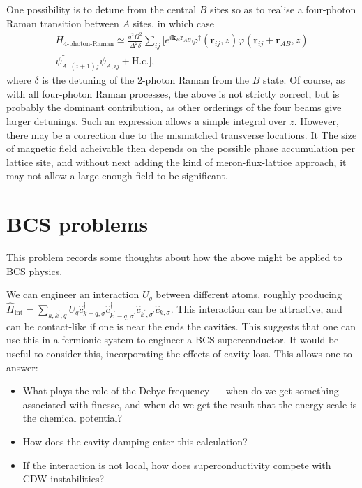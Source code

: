 \documentclass[twocolumn]{revtex4-1}
\renewcommand{\vec}[1]{\mathbf{#1}}
\begin{document}
One possibility is to detune from the central $B$ sites so as to
realise a four-photon Raman transition between $A$ sites, in which
case
\begin{multline}
  \label{eq:22}
  H_{\text{4-photon-Raman}} \simeq
  \frac{g^2\Omega^2}{\Delta^2 \delta}
  \sum_{ij} \Biggl[
    e^{i\vec{k}_R \vec{r}_{AB}} 
    \varphi^\dagger(\vec{r}_{ij},z) 
    \varphi^{}(\vec{r}_{ij}+\vec{r}_{AB},z) 
    \\\psi^\dagger_{A,(i+1)j} \psi^{}_{A,ij} 
    + \text{H.c.}\Biggr],
\end{multline}
where $\delta$ is the detuning of the 2-photon Raman from the $B$
state.  Of course, as with all four-photon Raman processes, the above
is not strictly correct, but is probably the dominant contribution, as
other orderings of the four beams give larger detunings.  Such an
expression allows a simple integral over $z$.  However, there may be a
correction due to the mismatched transverse locations.  It The size of
magnetic field acheivable then depends on the possible phase
accumulation per lattice site, and without next adding the kind of
meron-flux-lattice approach, it may not allow a large enough field to
be significant.


\section{BCS problems}
\label{sec:bcs-problems}

This problem records some thoughts about how the above might be applied to BCS
physics.

We can engineer an interaction $U_q$ between different atoms, roughly
producing $\hat{H}_{\text{int}} = \sum_{k,k^\prime,q} U_q
{\hat{c}}^{\dagger}_{k+q,\sigma}
{\hat{c}}^{\dagger}_{k^\prime-q,\sigma^\prime}
{\hat{c}}^{}_{k^\prime,\sigma^\prime} {\hat{c}}^{}_{k,\sigma}$.  This
interaction can be attractive, and can be contact-like if one is near
the ends the cavities.  This suggests that one can use this in a
fermionic system to engineer a BCS superconductor.  It would be useful
to consider this, incorporating the effects of cavity loss.  This allows one
to answer:
\begin{itemize}
\item What plays the role of the Debye frequency --- when do we get something
  associated with finesse, and when do we get the result that the energy
  scale is the chemical potential?
\item How does the cavity damping enter this calculation?
\item If the interaction is not local, how does superconductivity
  compete with CDW instabilities?
\end{itemize}
\end{document}
